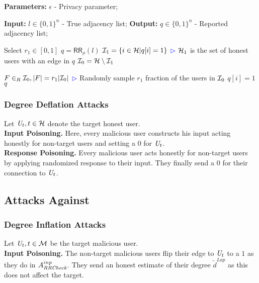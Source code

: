 \begin{algorithm}[bt]
  \caption{$A_{\DegRRCheck}^{resp}: \{0,1\}^n\mapsto\{0,1\}^n$ }\label{alg:att-resp-inf}
  \begin{algorithmic}[1]
  \Statex \textbf{Parameters:} $\epsilon$ - Privacy parameter;
  
  \Statex\textbf{Input:} $l \in \{0,1\}^n$ - True adjacency list;
  \Statex \textbf{Output:} $q \in \{0,1\}^n$ - Reported adjacency list;
  \vspace{0.2cm}
  
  \State Select $r_1\in [0,1]$
  \State $q = \textsf{RR}_\rho (l)$ 
\State $\mathcal{I}_1=\{i \in \mathcal{H}| q[i]=1\}$ 
\Statex \hfill\textcolor{blue}{$\rhd$} $\mathcal{H}_1$ is the set of honest users with an edge in $q$
\State $\mathcal{I}_0 = \mathcal{H} \setminus \mathcal{I}_1$

    \State $F\in_R \mathcal{I}_0, |F|=r_1|\mathcal{I}_0|$
    \Statex \hfill\textcolor{blue}{$\rhd$} Randomly sample $r_1$ fraction of the users in $\mathcal{I}_0$ 
  \State $q[i]=1$ 
  \EndFor
  \Return $q$
  \end{algorithmic}
\end{algorithm}

\subsubsection{Degree Deflation Attacks}
Let $\textit{U}_t, t \in \mathcal{H}$ denote the target honest user. \\\noindent\textbf{Input Poisoning.} Here, every malicious user constructs his input acting honestly for non-target users and setting a $0$ for $\textit{U}_t$.
\\\noindent\textbf{Response Poisoning.} 
Every malicious user acts honestly for non-target users by applying randomized response to their input. They finally send a $0$ for their connection to $\textit{U}_t$.
\subsection{Attacks Against \DegHybrid{}}

\subsubsection{Degree Inflation Attacks}
Let $\textit{U}_t, t \in \mathcal{M}$ be the target malicious user.
\\
\noindent\textbf{Input Poisoning.} The non-target malicious users flip their edge to $\textit{U}_t$ to a $1$ as they do in $A_{\textit{RRCheck}{}}^{inp}$. They send an honest estimate of their degree $\tilde{d}^{Lap}$ as this does not affect the target.


